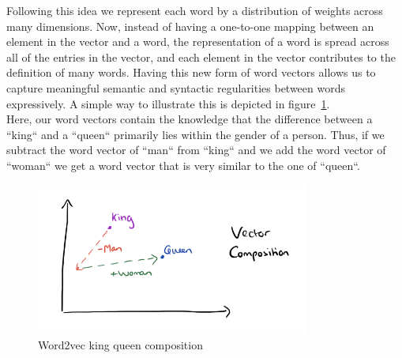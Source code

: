 Following this idea we represent each word by a distribution of weights across many dimensions. Now, instead of having a one-to-one mapping between an element in the vector and a word, the representation of a word is spread across all of the entries in the vector, and each element in the vector contributes to the definition of many words. Having this new form of word vectors allows us to capture meaningful semantic and syntactic regularities between words expressively. A simple way to illustrate this is depicted in figure~\ref{fig:word2vec_king_queen_composition}. \\
Here, our word vectors contain the knowledge that the difference between a “king“ and a “queen“ primarily lies within the gender of a person. Thus, if we subtract the word vector of “man“ from “king“ and we add the word vector of “woman“ we get a word vector that is very similar to the one of “queen“.

\begin{figure}[h]
  \includegraphics[height=5cm]{img/word2vec-king-queen-composition}
  \caption{Word2vec king queen composition}
\label{fig:word2vec_king_queen_composition}
\end{figure}

